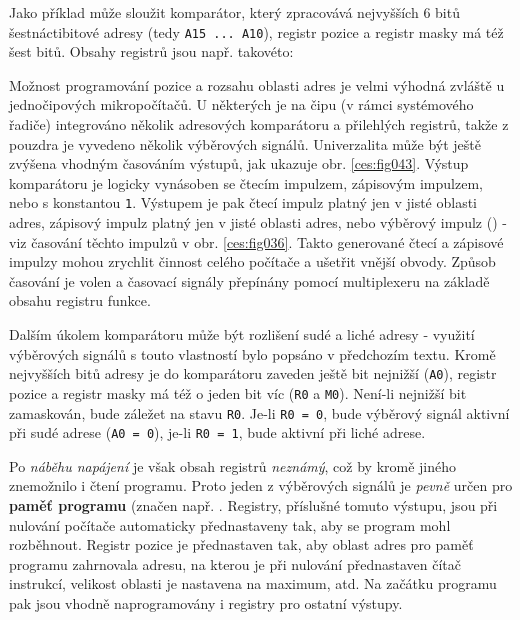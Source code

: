       Jako příklad může sloužit komparátor, který zpracovává nejvyšších 6 bitů šestnáctibitové 
      adresy (tedy  \texttt{A15 ... A10}), registr pozice a registr masky má též šest bitů. Obsahy 
      registrů jsou např. takovéto:

    
      Možnost programování pozice a rozsahu oblasti adres je velmi výhodná zvláště u jednočipových
      mikropočítačů. U některých je na čipu (v rámci systémového řadiče) integrováno několik
      adresových komparátoru a přilehlých registrů, takže z pouzdra je vyvedeno několik výběrových
      signálů. Univerzalita může být ještě zvýšena vhodným časováním výstupů, jak ukazuje obr.
      \ref{ces:fig043}. Výstup komparátoru je logicky vynásoben se čtecím impulzem, zápisovým
      impulzem, nebo s konstantou \texttt{1}. Výstupem je pak čtecí impulz platný jen v jisté
      oblasti adres, zápisový impulz platný jen v jisté oblasti adres, nebo výběrový impulz
      () - viz časování těchto impulzů v obr. \ref{ces:fig036}. Takto
      generované čtecí a zápisové impulzy mohou zrychlit činnost celého počítače a ušetřit vnější
      obvody. Způsob časování je volen a časovací signály přepínány pomocí multiplexeru na základě
      obsahu registru funkce.
      
      Dalším úkolem komparátoru může být rozlišení sudé a liché adresy - využití výběrových signálů 
      s touto vlastností bylo popsáno v předchozím textu. Kromě nejvyšších bitů adresy je do 
      komparátoru zaveden ještě bit nejnižší (\texttt{A0}), registr pozice a registr masky má též o 
      jeden bit víc (\texttt{R0} a \texttt{M0}). Není-li nejnižší bit zamaskován, bude záležet na 
      stavu \texttt{R0}. Je-li \texttt{R0 = 0}, bude výběrový signál aktivní při sudé adrese 
      (\texttt{A0 = 0}), je-li \texttt{R0 = 1}, bude aktivní při liché adrese.
      
      Po \emph{náběhu napájení} je však obsah registrů \emph{neznámý}, což by kromě jiného 
      znemožnilo i čtení programu. Proto jeden z výběrových signálů je \emph{pevně} určen pro 
      \textbf{paměť programu} (značen např. . Registry, příslušné 
      tomuto výstupu, jsou při nulování počítače automaticky přednastaveny tak, aby se program mohl 
      rozběhnout. Registr pozice je přednastaven tak, aby oblast adres pro paměť programu 
      zahrnovala adresu, na kterou je při nulování přednastaven čítač instrukcí, velikost oblasti 
      je nastavena na maximum, atd. Na začátku programu pak jsou vhodně naprogramovány i registry 
      pro ostatní výstupy.
      
